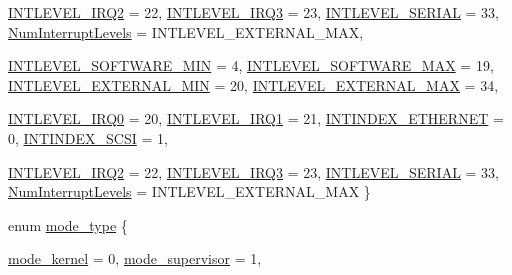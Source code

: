\begin{DoxyCompactItemize}
\par
\hyperlink{namespaceMipsISA_aa201d1f9b8ac67b80bdf6c08f370558caadce35d59b8bb4154d22aa7f6ab9036e}{INTLEVEL\_\-IRQ2} =  22, 
\hyperlink{namespaceMipsISA_aa201d1f9b8ac67b80bdf6c08f370558ca01099931d96b93a7403c65cd2ff5985d}{INTLEVEL\_\-IRQ3} =  23, 
\hyperlink{namespaceMipsISA_aa201d1f9b8ac67b80bdf6c08f370558ca6443c5917158463950c92bf8ec28a6eb}{INTLEVEL\_\-SERIAL} =  33, 
\hyperlink{namespaceMipsISA_aa201d1f9b8ac67b80bdf6c08f370558ca1b6c9928bdb9383e27bba1338b3f7e02}{NumInterruptLevels} =  INTLEVEL\_\-EXTERNAL\_\-MAX, 
\par
\hyperlink{namespaceMipsISA_aa201d1f9b8ac67b80bdf6c08f370558ca8db7857d98d7e42b3e02bed7c3c540ba}{INTLEVEL\_\-SOFTWARE\_\-MIN} =  4, 
\hyperlink{namespaceMipsISA_aa201d1f9b8ac67b80bdf6c08f370558ca9918551eda4baa1f4e11aaf334bb894b}{INTLEVEL\_\-SOFTWARE\_\-MAX} =  19, 
\hyperlink{namespaceMipsISA_aa201d1f9b8ac67b80bdf6c08f370558cafc78264c66a1ac704f17daa5fa9f9260}{INTLEVEL\_\-EXTERNAL\_\-MIN} =  20, 
\hyperlink{namespaceMipsISA_aa201d1f9b8ac67b80bdf6c08f370558cae599256ab529cbe8194cbdde120144f5}{INTLEVEL\_\-EXTERNAL\_\-MAX} =  34, 
\par
\hyperlink{namespaceMipsISA_aa201d1f9b8ac67b80bdf6c08f370558cadce4ff34f9aaeca71ba8d90672214bec}{INTLEVEL\_\-IRQ0} =  20, 
\hyperlink{namespaceMipsISA_aa201d1f9b8ac67b80bdf6c08f370558cad864f4251825107a9b1858c1fbc868c5}{INTLEVEL\_\-IRQ1} =  21, 
\hyperlink{namespaceMipsISA_aa201d1f9b8ac67b80bdf6c08f370558ca0fed6fcec83dc8d0bd48f50010ad9d0d}{INTINDEX\_\-ETHERNET} =  0, 
\hyperlink{namespaceMipsISA_aa201d1f9b8ac67b80bdf6c08f370558ca34f32f6cdf764c379b096e418b18f9c3}{INTINDEX\_\-SCSI} =  1, 
\par
\hyperlink{namespaceMipsISA_aa201d1f9b8ac67b80bdf6c08f370558caadce35d59b8bb4154d22aa7f6ab9036e}{INTLEVEL\_\-IRQ2} =  22, 
\hyperlink{namespaceMipsISA_aa201d1f9b8ac67b80bdf6c08f370558ca01099931d96b93a7403c65cd2ff5985d}{INTLEVEL\_\-IRQ3} =  23, 
\hyperlink{namespaceMipsISA_aa201d1f9b8ac67b80bdf6c08f370558ca6443c5917158463950c92bf8ec28a6eb}{INTLEVEL\_\-SERIAL} =  33, 
\hyperlink{namespaceMipsISA_aa201d1f9b8ac67b80bdf6c08f370558ca1b6c9928bdb9383e27bba1338b3f7e02}{NumInterruptLevels} =  INTLEVEL\_\-EXTERNAL\_\-MAX
 \}
\item 
enum \hyperlink{namespaceMipsISA_a19269c193c0c4866cdc4e5abd433f9fc}{mode\_\-type} \{ \par
\hyperlink{namespaceMipsISA_a19269c193c0c4866cdc4e5abd433f9fcaf9ca40d36bda60aea728f69a10a455a1}{mode\_\-kernel} =  0, 
\hyperlink{namespaceMipsISA_a19269c193c0c4866cdc4e5abd433f9fcab3d3f3b4766251166f2c8057fa484f19}{mode\_\-supervisor} =  1, 

\end{DoxyCompactItemize}
